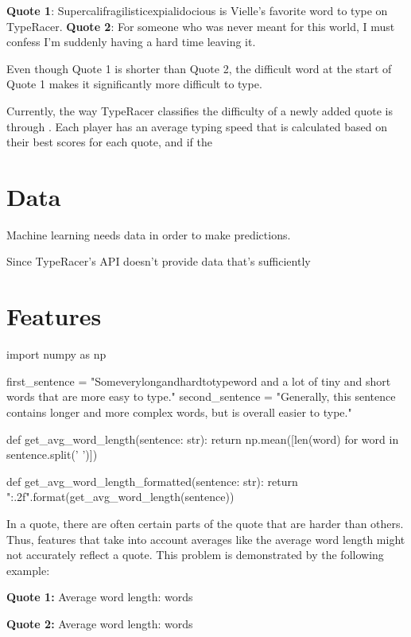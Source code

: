 \documentclass{article}
\newenvironment{zeroindent}
  {\par\setlength{\parindent}{0pt}}
  {\par}
\begin{document}
\textbf{Quote 1}: Supercalifragilisticexpialidocious is Vielle's favorite word to type on TypeRacer.
\textbf{Quote 2}: For someone who was never meant for this world, I must confess I'm suddenly having a hard time leaving it.

Even though Quote 1 is shorter than Quote 2, the difficult word at the start of Quote 1 makes it significantly more difficult to type.

Currently, the way TypeRacer classifies the difficulty of a newly added quote is through . Each player has an average typing speed that is calculated based on their best scores for each quote, and if the

\section{Data}


Machine learning needs data in order to make predictions.

Since TypeRacer's API doesn't provide data that's sufficiently

\section{Features}

\begin{pycode}
import numpy as np

first_sentence = "Someverylongandhardtotypeword and a lot of tiny and short words that are more easy to type."
second_sentence = "Generally, this sentence contains longer and more complex words, but is overall easier to type."

def get_avg_word_length(sentence: str):
	return np.mean([len(word) for word in sentence.split(' ')])

def get_avg_word_length_formatted(sentence: str):
	return "{:.2f}".format(get_avg_word_length(sentence))
\end{pycode}

In a quote, there are often certain parts of the quote that are harder than others. Thus, features that take into account averages like the average word length might not accurately reflect a quote. This problem is demonstrated by the following example:

\medskip

\begin{zeroindent}
	\textbf{Quote 1:} 
	\newline
	Average word length:  words

	\smallskip

	\textbf{Quote 2:} 
	\newline
	Average word length:  words
\end{zeroindent}
\end{document}
